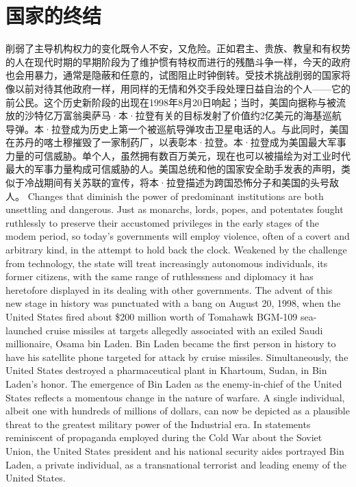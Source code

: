 \section{国家的终结}
\begin{paracol}{2}[]
削弱了主导机构权力的变化既令人不安，又危险。正如君主、贵族、教皇和有权势的人在现代时期的早期阶段为了维护惯有特权而进行的残酷斗争一样，今天的政府也会用暴力，通常是隐蔽和任意的，试图阻止时钟倒转。受技术挑战削弱的国家将像以前对待其他政府一样，用同样的无情和外交手段处理日益自治的个人——它的前公民。这个历史新阶段的出现在1998年8月20日响起；当时，美国向据称与被流放的沙特亿万富翁奥萨马·本·拉登有关的目标发射了价值约2亿美元的海基巡航导弹。本·拉登成为历史上第一个被巡航导弹攻击卫星电话的人。与此同时，美国在苏丹的喀土穆摧毁了一家制药厂，以表彰本·拉登。本·拉登成为美国最大军事力量的可信威胁。单个人，虽然拥有数百万美元，现在也可以被描绘为对工业时代最大的军事力量构成可信威胁的人。美国总统和他的国家安全助手发表的声明，类似于冷战期间有关苏联的宣传，将本·拉登描述为跨国恐怖分子和美国的头号敌人。
\switchcolumn
Changes that diminish the power of predominant institutions are both unsettling and dangerous. Just as monarchs, lords, popes, and potentates fought ruthlessly to preserve their accustomed privileges in the early stages of the modem period, so today's governments will employ violence, often of a covert and arbitrary kind, in the attempt to hold back the clock. Weakened by the challenge from technology, the state will treat increasingly autonomous individuals, its former citizens, with the same range of ruthlessness and diplomacy it has heretofore displayed in its dealing with other governments. The advent of this new stage in history was punctuated with a bang on August 20, 1998, when the United States fired about \$200 million worth of Tomahawk BGM-109 sea-launched cruise missiles at targets allegedly associated with an exiled Saudi millionaire, Osama bin Laden. Bin Laden became the first person in history to have his satellite phone targeted for attack by cruise missiles. Simultaneously, the United States destroyed a pharmaceutical plant in Khartoum, Sudan, in Bin Laden's honor. The emergence of Bin Laden as the enemy-in-chief of the United States reflects a momentous change in the nature of warfare. A single individual, albeit one with hundreds of millions of dollars, can now be depicted as a plausible threat to the greatest military power of the Industrial era. In statements reminiscent of propaganda employed during the Cold War about the Soviet Union, the United States president and his national security aides portrayed Bin Laden, a private individual, as a transnational terrorist and leading enemy of the United States.

\end{paracol}
